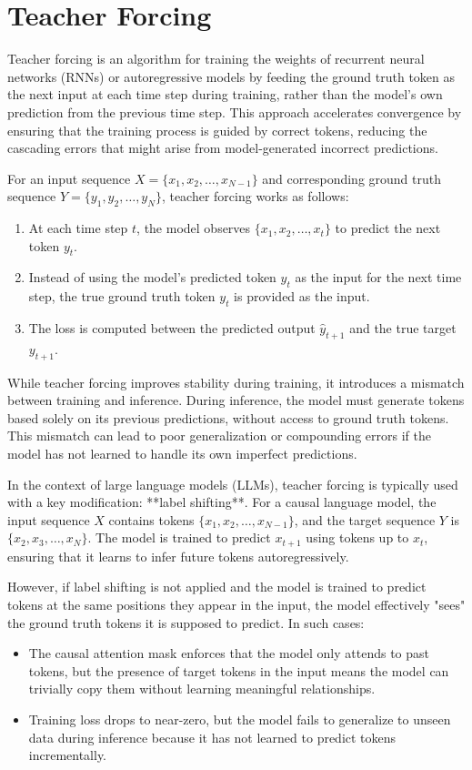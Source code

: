 \documentclass[12pt]{article}
\begin{document}
\section {Teacher Forcing}
Teacher forcing is an algorithm for training the weights of recurrent neural networks (RNNs) or autoregressive models by feeding the ground truth token as the next input at each time step during training, rather than the model's own prediction from the previous time step. This approach accelerates convergence by ensuring that the training process is guided by correct tokens, reducing the cascading errors that might arise from model-generated incorrect predictions.

For an input sequence $X = \{x_1, x_2, \dots, x_{N-1}\}$ and corresponding ground truth sequence $Y = \{y_1, y_2, \dots, y_N\}$, teacher forcing works as follows:
\begin{enumerate}
    \item At each time step $t$, the model observes $\{x_1, x_2, \dots, x_t\}$ to predict the next token $y_t$.
    \item Instead of using the model's predicted token $\hat{y}_t$ as the input for the next time step, the true ground truth token $y_t$ is provided as the input.
    \item The loss is computed between the predicted output $\hat{y}_{t+1}$ and the true target $y_{t+1}$.
\end{enumerate}

While teacher forcing improves stability during training, it introduces a mismatch between training and inference. During inference, the model must generate tokens based solely on its previous predictions, without access to ground truth tokens. This mismatch can lead to poor generalization or compounding errors if the model has not learned to handle its own imperfect predictions.

In the context of large language models (LLMs), teacher forcing is typically used with a key modification: **label shifting**. For a causal language model, the input sequence $X$ contains tokens $\{x_1, x_2, \dots, x_{N-1}\}$, and the target sequence $Y$ is $\{x_2, x_3, \dots, x_N\}$. The model is trained to predict $x_{t+1}$ using tokens up to $x_t$, ensuring that it learns to infer future tokens autoregressively.

However, if label shifting is not applied and the model is trained to predict tokens at the same positions they appear in the input, the model effectively "sees" the ground truth tokens it is supposed to predict. In such cases:
\begin{itemize}
    \item The causal attention mask enforces that the model only attends to past tokens, but the presence of target tokens in the input means the model can trivially copy them without learning meaningful relationships.
    \item Training loss drops to near-zero, but the model fails to generalize to unseen data during inference because it has not learned to predict tokens incrementally.
\end{itemize}
\end{document}
